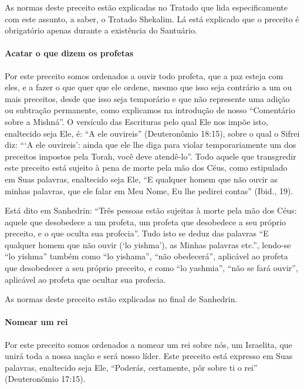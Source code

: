 As normas deste preceito estão explicadas no Tratado que lida
especificamente com este assunto, a saber, o Tratado Shekalim. Lá está
explicado que o preceito é obrigatório apenas durante a existência do
Santuário.

\paragraph{Acatar o que dizem os profetas}

Por este preceito somos ordenados a ouvir todo profeta, que a paz esteja
com eles, e a fazer o que quer que ele ordene, mesmo que isso seja contrário a um ou mais preceitos, desde que isso seja temporário e que não
represente uma adição ou subtração permanente, como explicamos na
introdução de nosso ``Comentário sobre a Mishná''. O versículo das
Escrituras pelo qual Ele nos impõe isto, enaltecido seja Ele, é: ``A ele
ouvireis'' (Deuteronômio 18:15), sobre o qual o Sifrei diz: ```A ele
ouvireis': ainda que ele lhe diga para violar temporariamente um dos
preceitos impostos pela Torah, você deve atendê-lo''. Todo aquele que
transgredir este preceito está sujeito à pena de morte pela mão dos
Céus, como estipulado em Suas palavras, enaltecido seja Ele, ``E
qualquer homem que não ouvir as minhas palavras, que ele falar em Meu
Nome, Eu lhe pedirei contas'' (Ibid., 19).

Está dito em Sanhedrin: ``Três pessoas estão sujeitas à morte pela mão
dos Céus: aquele que desobedece a um profeta, um profeta que desobedece
a seu próprio preceito, e o que oculta sua profecia''. Tudo isto se
deduz das palavras ``E qualquer homem que não ouvir (`lo yishma'), as
Minhas palavras etc.'', lendo-se ``lo yishma'' também como ``lo
yishama'', ``não obedecerá'', aplicável ao profeta que desobedecer a
seu próprio preceito, e como ``lo yashmia'', ``não se fará ouvir'',
aplicável ao profeta que ocultar sua profecia.

As normas deste preceito estão explicadas no final de Sanhedrin.

\paragraph{Nomear um rei}

Por este preceito somos ordenados a nomear um rei sobre nós, um
Israelita, que unirá toda a nossa nação e será nosso líder. Este
preceito está expresso em Suas palavras, enaltecido seja Ele,
``Poderás, certamente, pôr sobre ti o rei'' (Deuteronômio 17:15).

